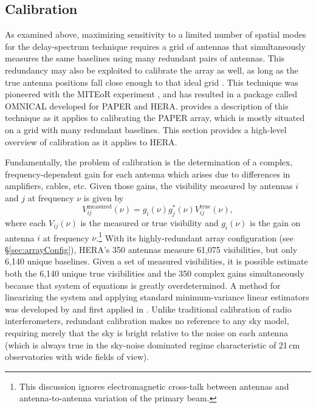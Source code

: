 \documentclass[preprint,11pt]{aastex}
\begin{document}
\subsection{Calibration}
\label{sec:calibration}
As examined above, maximizing sensitivity to a limited number of spatial modes for the delay-spectrum technique requires a grid of antennas that simultaneously measures the same baselines using many redundant pairs of antennas. This redundancy may also be exploited to calibrate the array as well, as long as the true antenna positions fall close enough to that ideal grid \citep{liu_et_al2010}. This technique was pioneered with the MITEoR experiment \citep{zheng_et_al2014}, and has resulted in a package called OMNICAL developed for PAPER and HERA.  \citet{ali_et_al2015} provides a description of this technique as it applies to calibrating the PAPER array, which is mostly situated on a grid with many redundant baselines.  This section provides a high-level overview of calibration as it applies to HERA.

Fundamentally, the problem of calibration is the determination of a complex, frequency-dependent gain for each antenna which arises due to differences in amplifiers, cables, etc. Given those gains, the visibility measured by antennas $i$ and $j$ at frequency $\nu$ is given by 
\begin{equation}
V_{ij}^\text{measured}(\nu) = g_i(\nu) g_j^*(\nu) V_{ij}^\text{true}(\nu), 
\end{equation}
where each $V_{ij}(\nu)$ is the measured or true visibility and $g_i(\nu)$ is the gain on antenna $i$ at frequency $\nu$.\footnote{This discussion ignores electromagnetic cross-talk between antennas and antenna-to-antenna variation of the primary beam.} With its highly-redundant array configuration (see \S\ref{sec:arrayConfig}), HERA's 350 antennas measure 61,075 visibilities, but only 6,140 unique baselines. Given a set of measured visibilities, it is possible estimate both the 6,140 unique true visibilities and the 350 complex gains simultaneously because that system of equations is greatly overdetermined. A method for linearizing the system and applying standard minimum-variance linear estimators was developed by \citet{liu_et_al2010} and first applied in \citet{zheng_et_al2014}. Unlike traditional calibration of radio interferometers, redundant calibration makes no reference to any sky model, requiring merely that the sky is bright relative to the noise on each antenna (which is always true in the sky-noise dominated regime characteristic of 21\,cm observatories with wide fields of view). 
\end{document}

